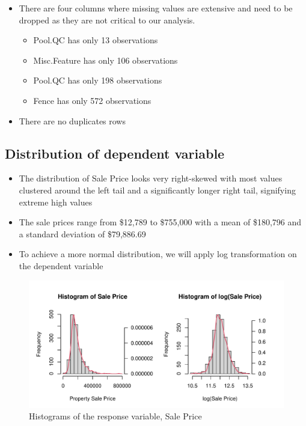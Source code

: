 \documentclass[aoas]{imsart}
\providecommand{\tightlist}{%
  \setlength{\itemsep}{0pt}\setlength{\parskip}{0pt}}
\numberwithin{equation}{section}
\theoremstyle{plain}
\theoremstyle{remark}
\begin{document}
\begin{itemize}
\tightlist
\item
  There are four columns where missing values are extensive and need to
  be dropped as they are not critical to our analysis.

  \begin{itemize}
  \tightlist
  \item
    Pool.QC has only 13 observations
  \item
    Misc.Feature has only 106 observations
  \item
    Pool.QC has only 198 observations
  \item
    Fence has only 572 observations
  \end{itemize}
\item
  There are no duplicates rows
\end{itemize}

\hypertarget{distribution-of-dependent-variable}{%
\subsection{Distribution of dependent
variable}\label{distribution-of-dependent-variable}}

\begin{itemize}
\tightlist
\item
  The distribution of Sale Price looks very right-skewed with most
  values clustered around the left tail and a significantly longer right
  tail, signifying extreme high values
\item
  The sale prices range from \$12,789 to \$755,000 with a mean of
  \$180,796 and a standard deviation of \$79,886.69
\item
  To achieve a more normal distribution, we will apply log
  transformation on the dependent variable
\end{itemize}

\begin{figure}
\centering
\includegraphics{STAT-444-FINAL-PROJECT-PROPOSAL_files/figure-latex/unnamed-chunk-5-1.pdf}
\caption{Histograms of the response variable, Sale Price\label{}}
\end{figure}
\end{document}
